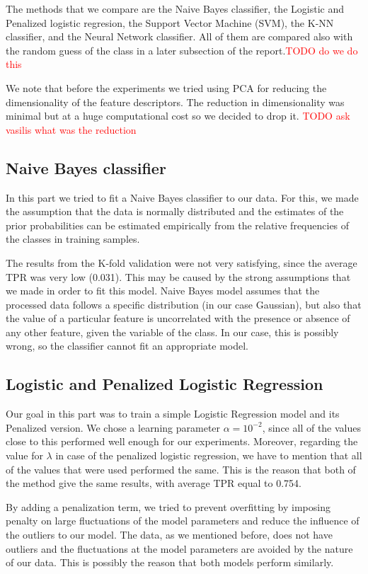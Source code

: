 \noindent The methods that we compare are the Naive Bayes classifier, the Logistic and Penalized logistic regresion, the Support Vector Machine (SVM), the K-NN classifier, and the Neural Network classifier. All of them are compared also with the random guess of the class in a later subsection of the report.\textcolor{red}{TODO do we do this}

\noindent We note that before the experiments we tried using PCA for reducing the dimensionality of the feature descriptors. The reduction in dimensionality was minimal but at a huge computational cost so we decided to drop it.
\textcolor{red}{TODO ask vasilis what was the reduction}

\subsection{Naive Bayes classifier}
\noindent In this part we tried to fit a Naive Bayes classifier to our data. For this, we made the assumption that the data is normally distributed and the estimates of the prior probabilities can be estimated empirically from the relative frequencies of the classes in training samples.

\noindent The results from the K-fold validation were not very satisfying, since the average TPR was very low (0.031). This may be caused by the strong assumptions that we made in order to fit this model. Naive Bayes model assumes that the processed data follows a specific distribution (in our case Gaussian), but also that the value of a particular feature is uncorrelated with the presence or absence of any other feature, given the variable of the class. In our case, this is possibly wrong, so the classifier cannot fit an appropriate model.

\subsection{Logistic and Penalized Logistic Regression}
\noindent Our goal in this part was to train a simple Logistic Regression model and its Penalized version. We chose a learning parameter $\alpha = 10^{-2}$, since all of the values close to this performed well enough for our experiments. Moreover, regarding the value for $\lambda$ in case of the penalized logistic regression, we have to mention that all of the values that were used performed the same. This is the reason that both of the method give the same results, with average TPR equal to 0.754.

\noindent By adding a penalization term, we tried to prevent overfitting by imposing penalty on large fluctuations of the model parameters and reduce the influence of the outliers to our model. The data, as we mentioned before, does not have outliers and the fluctuations at the model parameters are avoided by the nature of our data. This is possibly the reason that both models perform similarly. 

